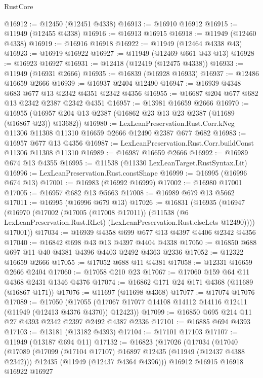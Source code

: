 \begin{lexlean}{RustCore}
\begin{coremodule}
@16912 := @12450 (@12451 @4338)
@16913 := @16910 @16912
@16915 := @11949 (@12455 @4338)
@16916 := @16913 @16915
@16918 := @11949 (@12460 @4338)
@16919 := @16916 @16918
@16922 := @11949 (@12464 @4338 @43)
@16923 := @16919 @16922
@16927 := @11949 (@12469 @661 @43 @13)
@16928 := @16923 @16927
@16931 := @12418 (@12419 (@12475 @4338))
@16933 := @11949 (@16931 @2666)
@16935 := @16839 (@16928 @16933)
@16937 := @12486 @16659 @2666
@16939 := @16937 @2404 @12490
@16947 := @16939 @4348 @683 @677 @13 @2342 @4351 @2342 @4356
@16955 := @16687 @204 @677 @682 @13 @2342 @2387 @2342 @4351
@16957 := @13981 @16659 @2666
@16970 := @16955 (@16957 @204 @13 @2387 (@16862 @23 @13 @23 @2387 (@11689 (@16867 @23)) @13682))
@16980 := LexLeanPreservation.Rust.Corr.kNeg
    @11306
    @11308
    @11310
    @16659
    @2666
    @12490
    @2387
    @677
    @682
@16983 := @16957 @677 @13 @4356
@16987 := LexLeanPreservation.Rust.Corr.buildConst @11306 @11308 @11310
@16989 := @16987 @16659 @2666
@16992 := @16989 @674 @13 @4355
@16995 := @11538 (@11330 LexLeanTarget.RustSyntax.Lit)
@16996 := LexLeanPreservation.Rust.constShape
@16999 := @16995 (@16996 @674 @13)
@17001 := @16983 (@16992 @16999)
@17002 := @16980 @17001
@17005 := @16957 @682 @13 @5663
@17008 := @16989 @679 @13 @5662
@17011 := @16995 (@16996 @679 @13)
@17026 := @16831
    (@16935
      (@16947
        (@16970
          (@17002
            (@17005 (@17008 @17011))
            (@11538 (@6 LexLeanPreservation.Rust.RLet) (LexLeanPreservation.Rust.elseLets @12490))))
        @17001))
@17034 := @16939 @4358 @699 @677 @13 @4397 @4406 @2342 @4356
@17040 := @16842 @698 @43 @13 @4397 @4404 @4338
@17050 := @16850 @688 @697 @11 @40 @4381 @4396 @4403 @2492 @4363 @2336
@17052 := @12322 @16659 @2666
@17055 := @17052 @688 @11 @4381
@17058 := @12331 @16659 @2666 @2404
@17060 := @17058 @210 @23
@17067 := @17060 @159 @64 @11 @4368 @2431 @1346 @4376
@17074 := @16862 @171 @24 @171 @4368 (@11689 (@16867 @171))
@17076 := @11697 (@11698 @4368)
@17077 := @17074 @17076
@17089 := @17050
    (@17055 (@17067 @17077 @14108 @14112 @14116 @12411 (@11949 (@12413 @4376 @4370)) @12423))
@17099 := @16850 @695 @214 @11 @27 @4393 @2342 @2397 @2492 @4387 @2336
@17101 := @16885 @694 @4393
@17103 := @13181 (@13182 @4393)
@17104 := @17101 @17103
@17107 := @11949 (@13187 @694 @11)
@17132 := @16823
    (@17026
      (@17034
        (@17040
          (@17089
            (@17099 (@17104 @17107) @16897 @12435 (@11949 (@12437 @4388 @2342)))
            @12435
            (@11949 (@12437 @4364 @4396)))
          @16912
          @16915
          @16918
          @16922
          @16927

\end{coremodule}
\end{lexlean}
